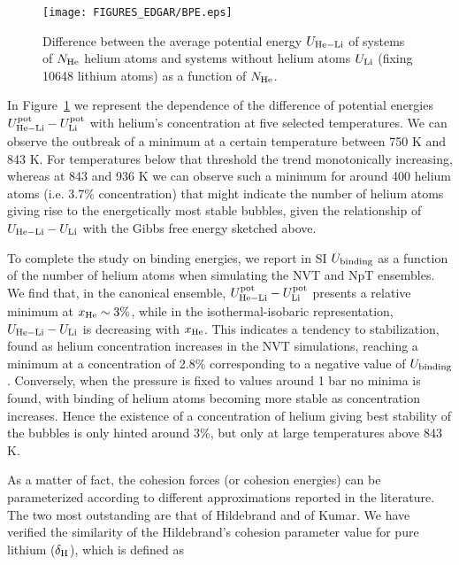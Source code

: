 \documentclass[jcp,amsmath,amssymb,preprint]{revtex4-1}
\begin{document}
    \begin{figure}
        \centering
        \texttt{[image: FIGURES\_EDGAR/BPE.eps]}
        \caption{Difference between the average potential energy  $U_{\rm He-Li}$ of systems of $N_{\rm He}$ helium atoms and systems without helium atoms  $U_{\rm Li}$ (fixing 10648 lithium atoms) as a function of $N_{\rm He}$. }
        \label{fig:BPE_vs_N}
    \end{figure}
In Figure~\ref{fig:BPE_vs_N} we represent the dependence of the difference of potential energies $U_{\rm He-Li}^{\rm pot} - U_{\rm Li}^{\rm pot}$ with helium's concentration at five selected temperatures.  We can observe the outbreak of a minimum at a certain temperature between 750 K and  843 K.  For temperatures below that threshold the trend monotonically increasing, whereas at 843 and 936 K we can observe such a minimum for around 400 helium atoms (i.e.  3.7\% concentration) that might indicate the number of helium atoms giving rise to the energetically most stable bubbles, given the  relationship of $U_{\rm He-Li} - U_{\rm Li}$ with the Gibbs free energy sketched above.  

To complete the study on binding energies, we report in SI $U_{\rm binding}$ as a function of the number of helium atoms when simulating the NVT and NpT ensembles.  We find that, in the canonical ensemble, $U_{\rm He-Li}^{\rm pot} - U_{\rm Li}^{\rm pot}$ presents a relative minimum at $x_{\rm He} \sim 3\%$, while in the isothermal-isobaric representation, $U_{\rm He-Li} - U_{\rm Li}$ is decreasing with $x_{\rm He}$.  This indicates a tendency to stabilization, found as helium concentration increases in the NVT simulations, reaching a minimum at a concentration of 2.8\% corresponding to a negative value of $U_{\rm binding}$.  Conversely,  when the pressure is fixed to values around 1 bar no minima is found,  with binding of helium atoms becoming more stable as concentration increases.  Hence the existence of a concentration of helium giving best stability of the bubbles is only hinted around 3\%, but only at large temperatures above 843 K.
  
As a matter of fact, the cohesion forces (or cohesion energies) can be parameterized according to  different approximations reported in the literature.  The two most outstanding are that of Hildebrand\cite{hildebrand1954simple} and of Kumar\cite{kumar1972immiscibility}.  We have verified the similarity of the Hildebrand's cohesion parameter value for pure lithium ($\delta_{\rm H}$), which is defined as
\end{document}
